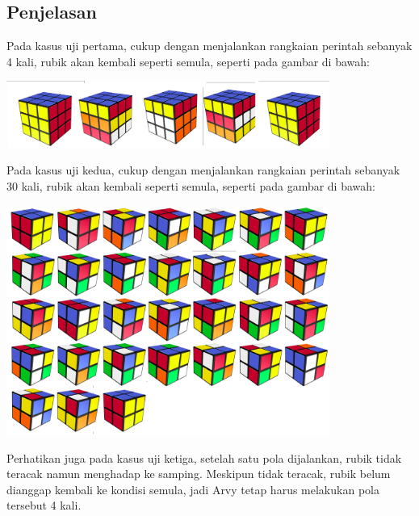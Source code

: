 \documentclass{article}
\begin{document}
\subsection*{Penjelasan}
Pada kasus uji pertama, cukup dengan menjalankan rangkaian perintah sebanyak 4 kali, rubik akan kembali seperti semula, seperti pada gambar di bawah:
\begin{center}
\includegraphics[width=400px]{sample-1}
\end{center}
Pada kasus uji kedua, cukup dengan menjalankan rangkaian perintah sebanyak 30 kali, rubik akan kembali seperti semula, seperti pada gambar di bawah:
\begin{center}
\includegraphics[width=400px]{sample-2}
\end{center}

Perhatikan juga pada kasus uji ketiga, setelah satu pola dijalankan, rubik tidak teracak namun menghadap ke samping. Meskipun tidak teracak, rubik belum dianggap kembali ke kondisi semula, jadi Arvy tetap harus melakukan pola tersebut 4 kali.
\pagebreak
\end{document}
